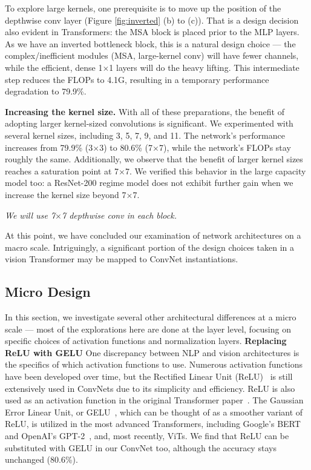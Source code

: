\documentclass[10pt,twocolumn,letterpaper]{article}
\renewcommand{\paragraph}[1]{\vspace{1.25mm}\noindent\textbf{#1}}
\begin{document}
 To explore large kernels, one prerequisite is to move up the position of the depthwise conv layer (Figure \ref{fig:inverted} (b) to (c)). That is a design decision also evident in Transformers: the MSA block is placed prior to the MLP layers. As we have an inverted bottleneck block, this is a natural design choice --- the complex/inefficient modules (MSA, large-kernel conv) will have fewer channels, while the efficient, dense 1$\times$1 layers will do the heavy lifting. This intermediate step reduces the FLOPs to 4.1G, resulting in a temporary performance degradation to 79.9\%.

\paragraph{Increasing the kernel size.}
With all of these preparations, the benefit of adopting larger kernel-sized convolutions is significant. We experimented with several kernel sizes, including 3, 5, 7, 9, and 11. The network's performance increases from 79.9\% (3$\times$3) to 80.6\% (7$\times$7), while the network's FLOPs stay roughly the same. Additionally, we observe that the benefit of larger kernel sizes reaches a saturation point at 7$\times$7. We verified this behavior in the large capacity model too: a ResNet-200 regime model does not exhibit further gain when we increase the kernel size beyond 7$\times$7. 

\textit{We will use 7$\times$7 depthwise conv in each block.} 

At this point, we have concluded our examination of network architectures on a macro scale. Intriguingly, a significant portion of the design choices taken in a vision Transformer may be mapped to ConvNet instantiations. 

\subsection{Micro Design}
In this section, we investigate several other architectural differences at a micro scale --- most of the explorations here are done at the layer level, focusing on specific choices of activation functions and normalization layers.  
\paragraph{Replacing ReLU with GELU}
One discrepancy between NLP and vision architectures is the specifics of which activation functions to use. Numerous activation functions have been developed over time, but the Rectified Linear Unit (ReLU)~\cite{Nair2010} is still extensively used in ConvNets due to its simplicity and efficiency. ReLU is also used as an activation function in the original Transformer paper~\cite{Vaswani2017}. The Gaussian Error Linear Unit, or GELU~\cite{Hendrycks2016}, which can be thought of as a smoother variant of ReLU, is utilized in the most advanced Transformers, including Google's BERT~\cite{Devlin2019} and OpenAI's GPT-2~\cite{Radford2019}, and, most recently, ViTs. We find that ReLU can be substituted with GELU in our ConvNet too, although the accuracy stays unchanged (80.6\%).
 
\end{document}
